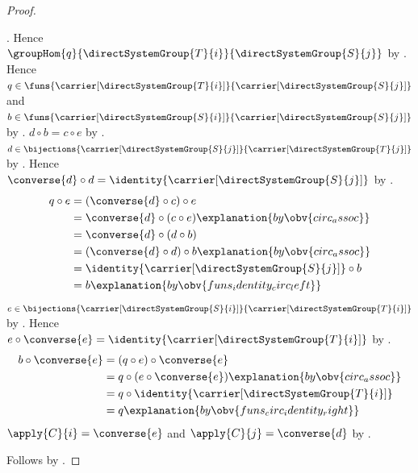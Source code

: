 \begin{proof}
\begin{subproof}
            .
        Hence $\groupHom{q}{\directSystemGroup{T}{i}}
            {\directSystemGroup{S}{j}}$ by
            .
        Hence $q\in
            \funs{\carrier[\directSystemGroup{T}{i}]}
                {\carrier[\directSystemGroup{S}{j}]}$ and
            $b\in
            \funs{\carrier[\directSystemGroup{S}{i}]}
                {\carrier[\directSystemGroup{S}{j}]}$ by
            .
        $d\circ b=c\circ e$ by
            .
        $d\in\bijections
            {\carrier[\directSystemGroup{S}{j}]}
            {\carrier[\directSystemGroup{T}{j}]}$ by
            .
        Hence $\converse{d}\circ d
            =\identity{\carrier[\directSystemGroup{S}{j}]}$ by
            .
        \begin{align*}
            q\circ e
                &=(\converse{d}\circ c)\circ e
                \\
                &=\converse{d}\circ(c\circ e)
                    \explanation{by \obv{circ_assoc}}
                \\
                &=\converse{d}\circ(d\circ b)
                \\
                &=(\converse{d}\circ d)\circ b
                    \explanation{by \obv{circ_assoc}}
                \\
                &=\identity{\carrier[\directSystemGroup{S}{j}]}\circ b
                \\
                &=b
                    \explanation{by \obv{funs_identity_circ_left}}
        \end{align*}
        $e\in\bijections
            {\carrier[\directSystemGroup{S}{i}]}
            {\carrier[\directSystemGroup{T}{i}]}$ by
            .
        Hence $e\circ\converse{e}
            =\identity{\carrier[\directSystemGroup{T}{i}]}$ by
            .
        \begin{align*}
            b\circ\converse{e}
                &=(q\circ e)\circ\converse{e}
                \\
                &=q\circ(e\circ\converse{e})
                    \explanation{by \obv{circ_assoc}}
                \\
                &=q\circ\identity{\carrier[\directSystemGroup{T}{i}]}
                \\
                &=q
                    \explanation{by \obv{funs_circ_identity_right}}
        \end{align*}
        $\apply{C}{i}=\converse{e}$ and
            $\apply{C}{j}=\converse{d}$ by
            .
    \end{subproof}
    Follows by .
\end{proof}

